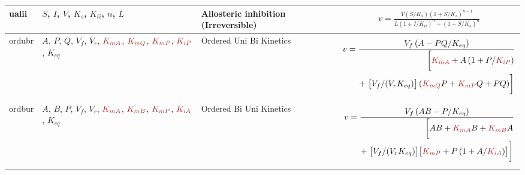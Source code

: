 \documentclass[10pt]{cekarticle}
\newcommand{\changed}[1]{\textcolor{BrickRed}{#1}}
\newenvironment{blockChanged}{\color{BrickRed}}{}
\begin{document}
\begin{table}[ht]
\begin{tabular}{|p{0.45in}|>{\raggedright}m{0.77in}|>{\raggedright}m{1.1in}|m{3.45in}|}
ualii & $S$, $I$, $V$, $K_s$, $K_{ii}$, $n$, $L$ & Allosteric inhibition
(Irreversible) &
\begin{blockChanged}
\begin{gather*}
v = \frac{V \left(S/K_s\right) \left( 1 + S/K_s\right)^{n-1}}{L \left(
1 + I/K_{ii}\right)^n + \left( 1 + S/K_s \right)^n}
\end{gather*}
\end{blockChanged}
\\ \hline

ordubr & $A$, $P$, $Q$, $V_f$, $V_r$, $\changed{K_{mA}}$, $\changed{K_{mQ}}$, $\changed{K_{mP}}$, $\changed{K_{iP}}$,
$K_{eq}$ & Ordered Uni Bi Kinetics &
\begin{blockChanged}
\begin{gather*}
v = \frac{V_f \left( A - P Q/K_{eq}\right)}{\begin{split}
\biggl[ \changed{K_{mA}} + A \left( 1 + P/\changed{K_{iP}}\right) \\
+\; \bigl[ V_f/(V_r K_{eq}) \bigr]
\left( \changed{K_{mQ}} P + \changed{K_{mP}} Q + P Q\right) \biggr]
\end{split}}
\end{gather*}
\end{blockChanged}
\\ \hline

ordbur & $A$, $B$, $P$, $V_f$, $V_r$, $\changed{K_{mA}}$, \changed{$\changed{K_{mB}}$}, $\changed{K_{mP}}$, $\changed{K_{iA}}$,
$K_{eq}$ & Ordered Bi Uni Kinetics &
\begin{blockChanged}
\begin{gather*}
v = \frac{V_f \left( A B -
P/K_{eq}\right)}{\begin{split}
\biggl[ A B + \changed{K_{mA}} B + \changed{\changed{K_{mB}}} A \\
+\; \bigl[ V_f/(V_r K_{eq}) \bigr] \bigl[ \changed{K_{mP}} + P
\left( 1 + A/\changed{K_{iA}}\right) \bigr] \biggr]
\end{split}}
\end{gather*}
\end{blockChanged}
\\ \hline


\end{tabular}
\end{table}
\end{document}
